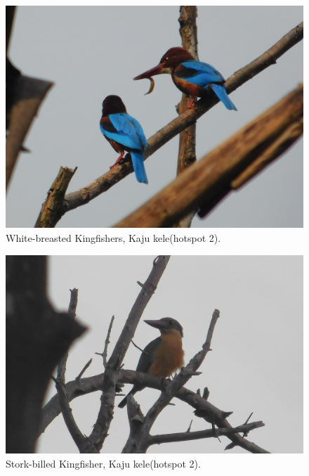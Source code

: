 \begin{figure}[!htpb]
    \centering
    \includegraphics[width=\linewidth]{Figures/kingfisher.JPG}
    \caption[]{White-breasted Kingfishers, Kaju kele(hotspot 2).}
    \label{fig:figure-01}
\end{figure}
\begin{figure}[!htpb]
    \centering
    \includegraphics[width=\linewidth]{Figures/stork-billed.JPG}
    \caption[]{Stork-billed Kingfisher, Kaju kele(hotspot 2).}
    \label{fig:figure-01}
\end{figure}
